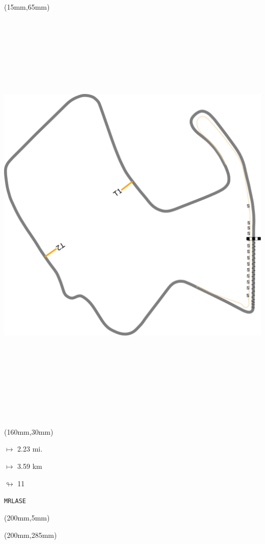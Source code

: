 \begin{textblock*}{185mm}(15mm,65mm)%
\centering
\mbox{\includegraphics[width=185mm,height=210mm,keepaspectratio]{PT/MRLASE.pdf}}
\end{textblock*}
\begin{textblock*}{40mm}(160mm,30mm)%
\Large
\par$\mapsto$ 2.23 mi.
\par$\mapsto$ 3.59 km
\par$\looparrowright$ 11
\par\hfill\tiny\tt MRLASE\\
\end{textblock*}
\begin{textblock*}{20mm}(200mm,5mm)%
\fbox{\thepage}
\label{MRLASE}
\end{textblock*}
\begin{textblock*}{20mm}(200mm,285mm)%
\fbox{\thepage}
\end{textblock*}

